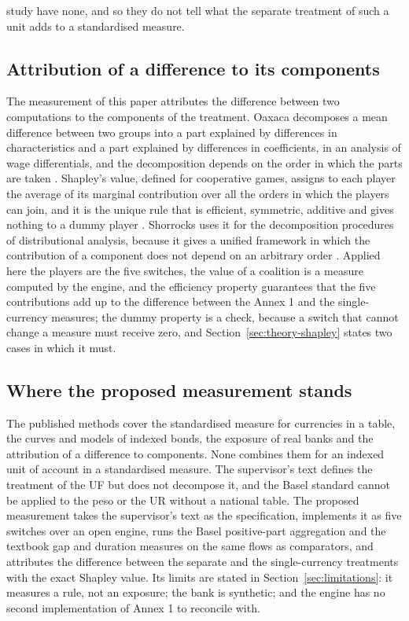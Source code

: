 study have none, and so they do not tell what the separate treatment of such a unit adds to a standardised measure.

\subsection{Attribution of a difference to its components}
\label{sec:rw-attribution}

The measurement of this paper attributes the difference between two computations to the components of the treatment. Oaxaca decomposes a mean difference between two groups into a part explained by differences in characteristics and a part explained by differences in coefficients, in an analysis of wage differentials, and the decomposition depends on the order in which the parts are taken \citep{Oaxaca1973}. Shapley's value, defined for cooperative games, assigns to each player the average of its marginal contribution over all the orders in which the players can join, and it is the unique rule that is efficient, symmetric, additive and gives nothing to a dummy player \citep{Shapley1953}. Shorrocks uses it for the decomposition procedures of distributional analysis, because it gives a unified framework in which the contribution of a component does not depend on an arbitrary order \citep{Shorrocks2013}. Applied here the players are the five switches, the value of a coalition is a measure computed by the engine, and the efficiency property guarantees that the five contributions add up to the difference between the Annex 1 and the single-currency measures; the dummy property is a check, because a switch that cannot change a measure must receive zero, and Section~\ref{sec:theory-shapley} states two cases in which it must.

\subsection{Where the proposed measurement stands}
\label{sec:rw-stands}

The published methods cover the standardised measure for currencies in a table, the curves and models of indexed bonds, the exposure of real banks and the attribution of a difference to components. None combines them for an indexed unit of account in a standardised measure. The supervisor's text defines the treatment of the UF but does not decompose it, and the Basel standard cannot be applied to the peso or the UR without a national table. The proposed measurement takes the supervisor's text as the specification, implements it as five switches over an open engine, runs the Basel positive-part aggregation and the textbook gap and duration measures on the same flows as comparators, and attributes the difference between the separate and the single-currency treatments with the exact Shapley value. Its limits are stated in Section~\ref{sec:limitations}: it measures a rule, not an exposure; the bank is synthetic; and the engine has no second implementation of Annex 1 to reconcile with.
